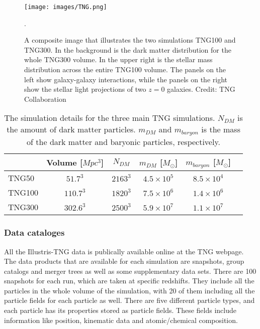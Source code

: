 \begin{figure}
    \centering
    \texttt{[image: images/TNG.png]}
    \caption{A composite image that illustrates the two simulations TNG100 and TNG300. In the background is the dark matter distribution for the whole TNG300 volume. In the upper right is the stellar mass distribution across the entire TNG100 volume. The panels on the left show galaxy-galaxy interactions, while the panels on the right show the stellar light projections of two $z=0$ galaxies. Credit: TNG Collaboration}.
    \label{tng_illustration}
\end{figure}

\begin{table}
\begin{center}
\begin{tabular}{ l| c c c c c } 
 \hline
 \hline
   &  Volume [$Mpc^3$] & $N_{DM}$ & $m_{DM}$ [$M_{\odot}$] & $m_{baryon}$ [$M_{\odot}$] \\
 \hline
 TNG50 & $51.7^3$ & $2163^3$ & $4.5 \times 10^5 $ & $8.5 \times 10^4 $ \\ 
 TNG100 & $110.7^3$ & $1820^3$ & $7.5 \times 10^6 $ & $1.4 \times 10^6 $  \\ 
 TNG300 & $302.6^3$ & $2500^3$ & $5.9 \times 10^7 $ & $1.1 \times 10^7 $  \\ 
 \hline 
 \end{tabular}
\end{center}
\caption{The simulation details for the three main TNG simulations. $N_{DM}$ is the amount of dark matter particles. $m_{DM}$ and $m_{baryon}$ is the mass of the dark matter and baryonic particles, respectively.}
 \label{TNG}
\end{table}

\subsubsection{Data cataloges}
All the Illustris-TNG data is publically available online at the TNG webpage. The data products that are available for each simulation are snapshots, group catalogs and merger trees as well as some supplementary data sets. There are 100 snapshots for each run, which are taken at specific redshifts. They include all the particles in the whole volume of the simulation, with 20 of them including all the particle fields for each particle as well. There are five different particle types, and each particle has its properties stored as particle fields. These fields include information like position, kinematic data and atomic/chemical composition. 


